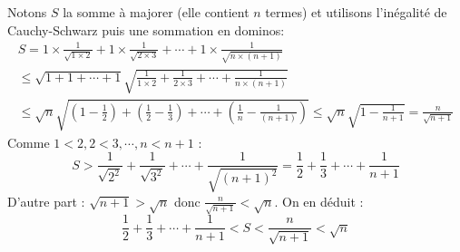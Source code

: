 Notons $S$ la somme à majorer (elle contient $n$ termes) et utilisons l'inégalité de Cauchy-Schwarz puis une sommation \og en dominos\fg:
\begin{multline*}
 S=
1\times\frac{1}{\sqrt{1\times 2}} + 1\times\frac{1}{\sqrt{2\times 3}} + \cdots + 1\times\frac{1}{\sqrt{n\times (n+1)}}\\
\leq \sqrt{1+1+\cdots+1}\sqrt{\frac{1}{1\times 2}+\frac{1}{2\times 3}+\cdots+\frac{1}{n\times(n+1)}} \\
\leq \sqrt{n}\sqrt{\left( 1 -\frac{1}{2}\right) + \left(\frac{1}{2}-\frac{1}{3}\right)
         +\cdots+\left(\frac{1}{n}-\frac{1}{(n+1)}\right) }
\leq  \sqrt{n}\sqrt{1 -\frac{1}{n+1}}= \frac{n}{\sqrt{n+1}}
\end{multline*}
Comme $1<2, 2<3, \cdots , n<n+1$ :
\begin{displaymath}
 S > \frac{1}{\sqrt{2^2}}+ \frac{1}{\sqrt{3^2}}+\cdots+\frac{1}{\sqrt{(n+1)^2}}
=\frac{1}{2}+\frac{1}{3}+\cdots+\frac{1}{n+1}
\end{displaymath}
D'autre part : $\sqrt{n+1}>\sqrt{n}$ donc $\frac{n}{\sqrt{n+1}}<\sqrt{n}$. On en déduit :
\begin{displaymath}
 \frac{1}{2}+\frac{1}{3}+\cdots+\frac{1}{n+1}
< S < \frac{n}{\sqrt{n+1}}<\sqrt{n}
\end{displaymath}
